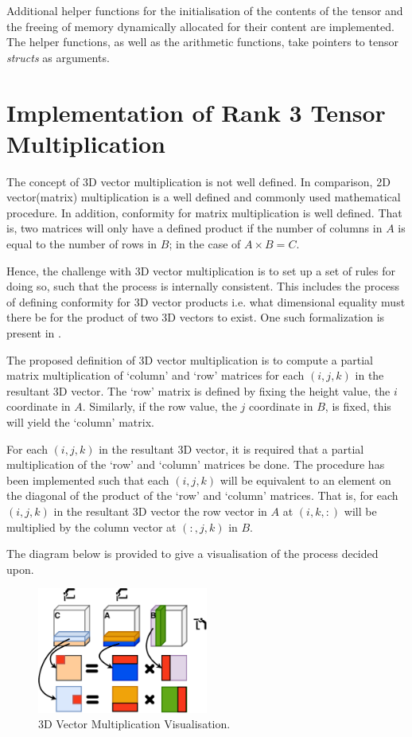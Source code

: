 \documentclass[journal,10pt]{IEEEtran}
\begin{document}
Additional helper functions for the initialisation of the contents of the tensor and the freeing of memory dynamically allocated for their content are implemented. The helper functions, as well as the arithmetic functions, take pointers to tensor \textit{structs} as arguments.


\section{Implementation of Rank 3 Tensor Multiplication}
The concept of 3D vector multiplication is not well defined. In comparison, 2D vector(matrix) multiplication is a well defined and commonly used mathematical procedure. In addition, conformity for matrix multiplication is well defined. That is, two matrices will only have a defined product if the number of columns in $A$ is equal to the number of rows in $B$; in the case of $A \times B = C$. 

Hence, the challenge with 3D vector multiplication is to set up a set of rules for doing so, such that the process is internally consistent. This includes the process of defining conformity for 3D vector products i.e. what dimensional equality must there be for the product of two 3D vectors to exist. One such formalization is present in \cite{solo2010multidimensional}.

The proposed definition of 3D vector multiplication is to compute a partial matrix multiplication of `column' and `row' matrices for each $(i,j,k)$ in the resultant 3D vector. The `row' matrix is defined by fixing the height value, the $i$ coordinate in $A$. Similarly, if the row value, the $j$ coordinate in $B$, is fixed, this will yield the `column' matrix. 

For each $(i,j,k)$ in the resultant 3D vector, it is required that a partial multiplication of the `row' and `column' matrices be done. The procedure has been implemented such that each $(i,j,k)$ will be equivalent to an element on the diagonal of the product of the `row' and `column' matrices. That is, for each $(i,j,k)$ in the resultant 3D vector the row vector in $A$ at $(i,k,:)$ will be multiplied by the column vector at $(:,j,k)$ in $B$.

The diagram below is provided to give a visualisation of the process decided upon.

\begin{figure}[H]
    \centering
    \includegraphics[width=0.5\textwidth]{export.pdf}
    \caption{3D Vector Multiplication Visualisation.}
    \label{}
\end{figure}
\end{document}
